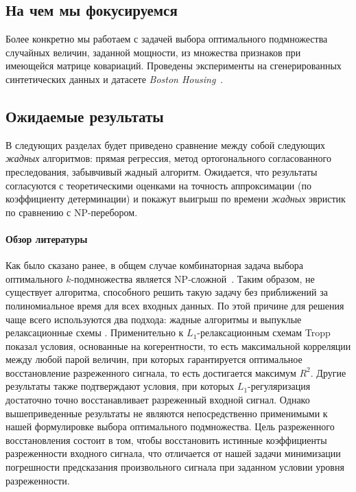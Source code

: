 \documentclass[preprint,12pt]{elsarticle}
\begin{document}
\subsection{На чем мы фокусируемся}
Более конкретно мы работаем с задачей выбора оптимального подмножества случайных величин, заданной мощности, из множества признаков при имеющейся матрице ковариаций. Проведены эксперименты на сгенерированных синтетических данных и датасете \textit{Boston Housing}~\cite{boston}.

\subsection{Ожидаемые результаты}
В следующих разделах будет приведено сравнение между собой следующих \textit{жадных} алгоритмов: прямая регрессия, метод ортогонального согласованного преследования, забывчивый жадный алгоритм. Ожидается, что результаты согласуются с теоретическими оценками на точность аппроксимации (по коэффициенту детерминации) и покажут выигрыш по времени \textit{жадных} эвристик по сравнению с NP-перебором.

\paragraph{Обзор литературы}

Как было сказано ранее, в общем случае комбинаторная задача выбора оптимального $k$-подмножества является NP-сложной~\cite{das2011submodular}. Таким образом, не существует алгоритма, способного решить такую задачу без приближений за полиномиальное время для всех входных данных. По этой причине для решения чаще всего используются два подхода: жадные алгоритмы \cite{miller2002subset, tropp2004greed, gilbert2003approximation} и выпуклые релаксационные схемы \cite{obozinski2012convex, tibshirani1996regression, candes2006stable}. Применительно к $L_1$-релаксационным схемам Tropp \cite{tropp2006just} показал условия, основанные на когерентности, то есть максимальной корреляции между любой парой величин, при которых гарантируется оптимальное восстановление разреженного сигнала, то есть достигается максимум $R^2$. Другие результаты \cite{zhou2009thresholding} также подтверждают условия, при которых $L_1$-регуляризация достаточно точно восстанавливает разреженный входной сигнал. Однако вышеприведенные результаты не являются непосредственно применимыми к
нашей формулировке выбора оптимального   подмножества. Цель разреженного восстановления состоит в том, чтобы восстановить истинные коэффициенты
разреженности входного сигнала, что отличается от нашей задачи минимизации погрешности предсказания произвольного сигнала при заданном условии
уровня разреженности.
\end{document}
